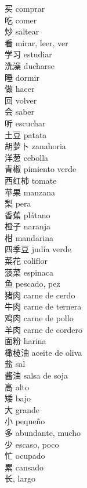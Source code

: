 买 \quad comprar\\
吃 \quad comer\\
炒 \quad saltear\\
看 \quad mirar, leer, ver\\
学习 \quad estudiar\\
洗澡 \quad ducharse\\
睡 \quad dormir\\
做 \quad hacer\\
回 \quad volver\\
会 \quad saber\\
听 \quad escuchar\\
土豆 \quad patata\\
胡萝卜 \quad zanahoria\\
洋葱 \quad cebolla\\
青椒 \quad pimiento verde\\
西红柿 \quad tomate\\
苹果 \quad manzana\\
梨 \quad pera\\
香蕉 \quad plátano\\
橙子 \quad naranja\\
柑 \quad mandarina\\
四季豆 \quad judía verde\\
菜花 \quad coliflor\\
菠菜 \quad espinaca\\
鱼 \quad pescado, pez\\
猪肉 \quad carne de cerdo\\
牛肉 \quad carne de ternera\\
鸡肉 \quad carne de pollo\\
羊肉 \quad carne de cordero\\
面粉 \quad harina\\
橄榄油 \quad aceite de oliva\\
盐 \quad sal\\
酱油 \quad salsa de soja\\
高 \quad alto\\
矮 \quad bajo\\
大 \quad grande\\
小 \quad pequeño\\
多 \quad abundante, mucho\\
少 \quad escaso, poco\\
忙 \quad ocupado\\
累 \quad cansado\\
长, \quad largo\\
